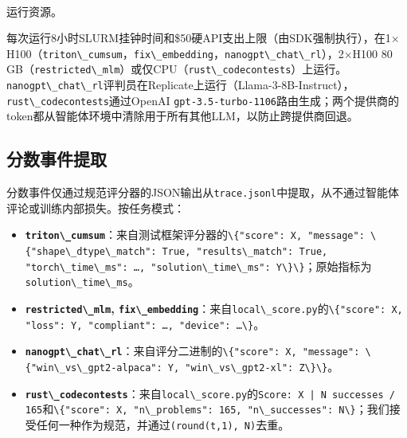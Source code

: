 \documentclass[
]{article}
\makeatletter
\let\oldparagraph\paragraph
\renewcommand{\paragraph}{
    \@ifstar
      \xxxParagraphStar
      \xxxParagraphNoStar
  }
\newcommand{\xxxParagraphStar}[1]{\oldparagraph*{#1}\mbox{}}
\newcommand{\xxxParagraphNoStar}[1]{\oldparagraph{#1}\mbox{}}
\newcommand{\passthrough}[1]{#1}
\providecommand{\tightlist}{%
  \setlength{\itemsep}{0pt}\setlength{\parskip}{0pt}}
\theoremstyle{definition}
\makeatother
\begin{document}
\paragraph{运行资源。}\label{ux8fd0ux884cux8d44ux6e90}

每次运行8小时SLURM挂钟时间和\$50硬API支出上限（由SDK强制执行），在1\(\times\)H100（\passthrough{\lstinline!triton\_cumsum!}，\passthrough{\lstinline!fix\_embedding!}，\passthrough{\lstinline!nanogpt\_chat\_rl!}），2\(\times\)H100
80
GB（\passthrough{\lstinline!restricted\_mlm!}）或仅CPU（\passthrough{\lstinline!rust\_codecontests!}）上运行。\passthrough{\lstinline!nanogpt\_chat\_rl!}评判员在Replicate上运行（Llama-3-8B-Instruct），\passthrough{\lstinline!rust\_codecontests!}通过OpenAI
\passthrough{\lstinline!gpt-3.5-turbo-1106!}路由生成；两个提供商的token都从智能体环境中清除用于所有其他LLM，以防止跨提供商回退。

\subsection{分数事件提取}\label{sec-app-extension-scoring}

分数事件仅通过规范评分器的JSON输出从\passthrough{\lstinline!trace.jsonl!}中提取，从不通过智能体评论或训练内部损失。按任务模式：

\begin{itemize}
\tightlist
\item
  \textbf{\passthrough{\lstinline!triton\_cumsum!}}：来自测试框架评分器的\passthrough{\lstinline!\{"score": X, "message": \{"shape\_dtype\_match": True, "results\_match": True, "torch\_time\_ms": …, "solution\_time\_ms": Y\}\}!}；原始指标为\passthrough{\lstinline!solution\_time\_ms!}。
\item
  \textbf{\passthrough{\lstinline!restricted\_mlm!},
  \passthrough{\lstinline!fix\_embedding!}}：来自\passthrough{\lstinline!local\_score.py!}的\passthrough{\lstinline!\{"score": X, "loss": Y, "compliant": …, "device": …\}!}。
\item
  \textbf{\passthrough{\lstinline!nanogpt\_chat\_rl!}}：来自评分二进制的\passthrough{\lstinline!\{"score": X, "message": \{"win\_vs\_gpt2-alpaca": Y, "win\_vs\_gpt2-xl": Z\}\}!}。
\item
  \textbf{\passthrough{\lstinline!rust\_codecontests!}}：来自\passthrough{\lstinline!local\_score.py!}的\passthrough{\lstinline!Score: X | N successes / 165!}和\passthrough{\lstinline!\{"score": X, "n\_problems": 165, "n\_successes": N\}!}；我们接受任何一种作为规范，并通过\passthrough{\lstinline!(round(t,1), N)!}去重。
\end{itemize}
\end{document}
